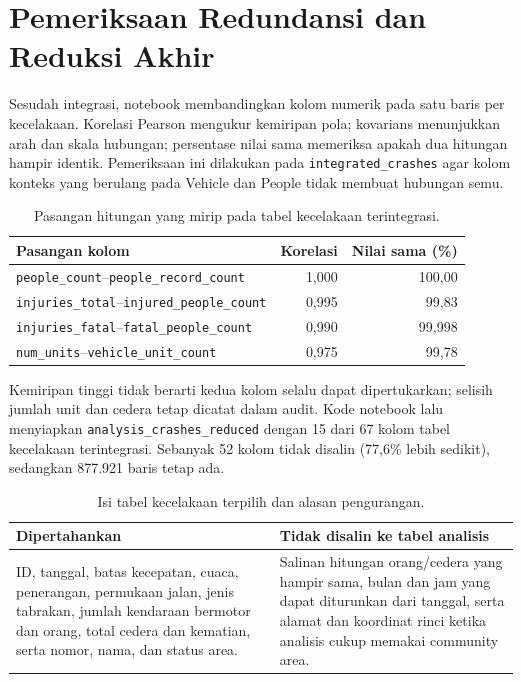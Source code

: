 \documentclass[10pt,a4paper]{article}
\begin{document}
\section{Pemeriksaan Redundansi dan Reduksi Akhir}

Sesudah integrasi, notebook membandingkan kolom numerik pada satu baris per
kecelakaan. Korelasi Pearson mengukur kemiripan pola; kovarians menunjukkan
arah dan skala hubungan; persentase nilai sama memeriksa apakah dua hitungan
hampir identik. Pemeriksaan ini dilakukan pada
\texttt{integrated\_crashes} agar kolom konteks yang berulang pada Vehicle
dan People tidak membuat hubungan semu.

\begin{table}[H]
\centering\small
\caption{Pasangan hitungan yang mirip pada tabel kecelakaan terintegrasi.}
\begin{tabularx}{\linewidth}{>{\raggedright\arraybackslash}Xrr}
\toprule
Pasangan kolom & Korelasi & Nilai sama (\%)\\
\midrule
\texttt{people\_count}--\texttt{people\_record\_count} & 1,000 & 100,00\\
\texttt{injuries\_total}--\texttt{injured\_people\_count} & 0,995 & 99,83\\
\texttt{injuries\_fatal}--\texttt{fatal\_people\_count} & 0,990 & 99,998\\
\texttt{num\_units}--\texttt{vehicle\_unit\_count} & 0,975 & 99,78\\
\bottomrule
\end{tabularx}
\end{table}

Kemiripan tinggi tidak berarti kedua kolom selalu dapat dipertukarkan;
selisih jumlah unit dan cedera tetap dicatat dalam audit. Kode notebook
lalu menyiapkan \texttt{analysis\_crashes\_reduced} dengan 15 dari 67 kolom
tabel kecelakaan terintegrasi. Sebanyak 52 kolom tidak disalin (77,6\% lebih sedikit),
sedangkan 877.921 baris tetap ada.

\begin{table}[H]
\centering\small
\caption{Isi tabel kecelakaan terpilih dan alasan pengurangan.}
\begin{tabularx}{\linewidth}{>{\raggedright\arraybackslash}X
>{\raggedright\arraybackslash}X}
\toprule
Dipertahankan & Tidak disalin ke tabel analisis\\
\midrule
ID, tanggal, batas kecepatan, cuaca, penerangan, permukaan jalan, jenis
tabrakan, jumlah kendaraan bermotor dan orang, total cedera dan kematian,
serta nomor, nama, dan status area. &
Salinan hitungan orang/cedera yang hampir sama, bulan dan jam yang
dapat diturunkan dari tanggal, serta alamat dan koordinat rinci ketika
analisis cukup memakai community area.\\
\bottomrule
\end{tabularx}
\end{table}
\end{document}
